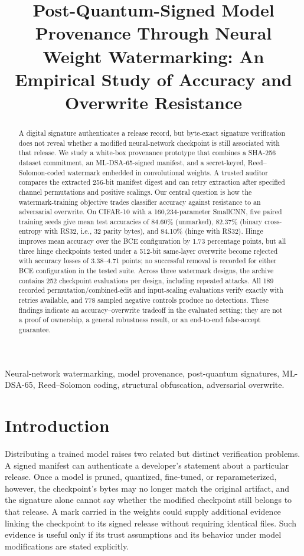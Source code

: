 \documentclass[conference]{IEEEtran}
\title{Post-Quantum-Signed Model Provenance Through Neural Weight Watermarking: An Empirical Study of Accuracy and Overwrite Resistance}
\author{\IEEEauthorblockN{Prajjith Kumar, Thejas K S, Krishnadasa Raja, and S Mahith Shree Vema Reddy}
\IEEEauthorblockA{RV College of Engineering, Bengaluru, India\\
}}
\begin{document}
\maketitle

\begin{abstract}
A digital signature authenticates a release record, but byte-exact signature
verification does not reveal whether a modified neural-network checkpoint is
still associated with that release. We study a white-box provenance prototype
that combines a SHA-256 dataset commitment, an ML-DSA-65-signed manifest, and a
secret-keyed, Reed--Solomon-coded watermark embedded in convolutional weights.
A trusted auditor compares the extracted 256-bit manifest digest and can retry
extraction after specified channel permutations and positive scalings. Our
central question is how the watermark-training objective trades classifier
accuracy against resistance to an adversarial overwrite. On CIFAR-10 with a
160,234-parameter SmallCNN, five paired training seeds give mean test
accuracies of 84.60\% (unmarked), 82.37\% (binary cross-entropy with RS32,
i.e., 32 parity bytes), and 84.10\% (hinge with RS32). Hinge improves mean
accuracy over the BCE configuration by 1.73 percentage points, but all three
hinge checkpoints tested under a 512-bit same-layer overwrite become rejected
with accuracy losses of 3.38--4.71 points; no successful removal is recorded
for either BCE configuration in the tested suite. Across three watermark
designs, the archive contains 252 checkpoint evaluations per design, including
repeated attacks. All 189 recorded permutation/combined-edit and input-scaling
evaluations verify exactly with retries available, and 778 sampled negative
controls produce no detections. These findings indicate an
accuracy--overwrite tradeoff in the evaluated setting; they are not a proof of
ownership, a general robustness result, or an end-to-end false-accept
guarantee.
\end{abstract}

\begin{IEEEkeywords}
Neural-network watermarking, model provenance, post-quantum signatures,
ML-DSA-65, Reed--Solomon coding, structural obfuscation, adversarial overwrite.
\end{IEEEkeywords}

\section{Introduction}
\label{sec:introduction}
Distributing a trained model raises two related but distinct verification
problems. A signed manifest can authenticate a developer's statement about a
particular release. Once a model is pruned, quantized, fine-tuned, or
reparameterized, however, the checkpoint's bytes may no longer match the
original artifact, and the signature alone cannot say whether the modified
checkpoint still belongs to that release. A mark carried in the weights could
supply additional evidence linking the checkpoint to its signed release without
requiring identical files. Such evidence is useful only if its trust
assumptions and its behavior under model modifications are stated explicitly.
\end{document}
